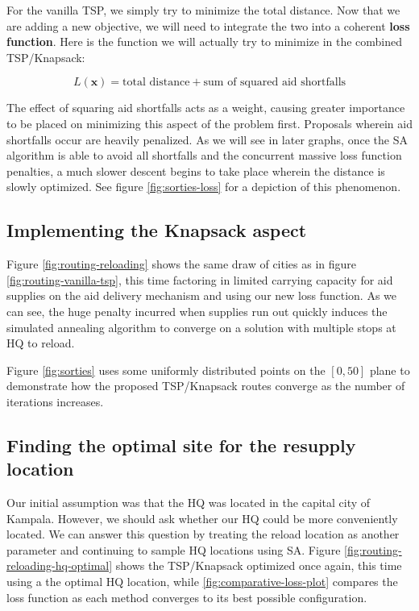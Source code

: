 \documentclass{article} %
\begin{document}
For the vanilla TSP, we simply try to minimize the total distance. Now that we are adding a new objective, we will need to integrate the two into a coherent \textbf{loss function}.  Here is the function we will actually try to minimize in the combined TSP/Knapsack:

$$L(\boldsymbol x) = \text{total distance} + \text{sum of squared aid shortfalls}$$

The effect of squaring aid shortfalls acts as a weight, causing greater importance to be placed on minimizing this aspect of the problem first. Proposals wherein aid shortfalls occur are heavily penalized. As we will see in later graphs, once the SA algorithm is able to avoid all shortfalls and the concurrent massive loss function penalties, a much slower descent begins to take place wherein the distance is slowly optimized. See figure \ref{fig:sorties-loss} for a depiction of this phenomenon.

\subsection{Implementing the Knapsack aspect}

Figure \ref{fig:routing-reloading} shows the same draw of cities as in figure \ref{fig:routing-vanilla-tsp}, this time factoring in limited carrying capacity for aid supplies on the aid delivery mechanism and using our new loss function. As we can see, the huge penalty incurred when supplies run out quickly induces the simulated annealing algorithm to converge on a solution with multiple stops at HQ to reload.


Figure \ref{fig:sorties} uses some uniformly distributed points on the $[0,50]$ plane to demonstrate how the proposed TSP/Knapsack routes converge as the number of iterations increases.


\subsection{Finding the optimal site for the resupply location}

Our initial assumption was that the HQ was located in the capital city of Kampala. However, we should ask whether our HQ could be more conveniently located. We can answer this question by treating the reload location as another parameter and continuing to sample HQ locations using SA. Figure \ref{fig:routing-reloading-hq-optimal} shows the TSP/Knapsack optimized once again, this time using a the optimal HQ location, while \ref{fig:comparative-loss-plot} compares the loss function as each method converges to its best possible configuration.
\end{document}
